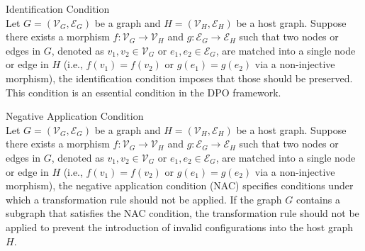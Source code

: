 \begin{definition}{Identification Condition \\}
	Let $G = (\mathcal{V}_G, \mathcal{E}_G)$ be a graph and $H = (\mathcal{V}_H, \mathcal{E}_H)$ be a host graph. Suppose there exists a morphism $f: \mathcal{V}_G \rightarrow \mathcal{V}_H$ and $g: \mathcal{E}_G \rightarrow \mathcal{E}_H$ such that two nodes or edges in $G$, denoted as $v_{1}, v_{2} \in \mathcal{V}_G$ or $e_{1}, e_{2} \in \mathcal{E}_G$, are matched into a single node or edge in $H$ (i.e., $f(v_{1}) = f(v_{2})$ or $g(e_{1}) = g(e_{2})$ via a non-injective morphism), the identification condition imposes that those should be preserved. This condition is an essential condition in the DPO framework.
\end{definition}

\begin{definition}{Negative Application Condition \\}
	Let $G = (\mathcal{V}_G, \mathcal{E}_G)$ be a graph and $H = (\mathcal{V}_H, \mathcal{E}_H)$ be a host graph. Suppose there exists a morphism $f: \mathcal{V}_G \rightarrow \mathcal{V}_H$ and $g: \mathcal{E}_G \rightarrow \mathcal{E}_H$ such that two nodes or edges in $G$, denoted as $v_{1}, v_{2} \in \mathcal{V}_G$ or $e_{1}, e_{2} \in \mathcal{E}_G$, are matched into a single node or edge in $H$ (i.e., $f(v_{1}) = f(v_{2})$ or $g(e_{1}) = g(e_{2})$ via a non-injective morphism), the negative application condition (NAC) specifies conditions under which a transformation rule should not be applied. If the graph $G$ contains a subgraph that satisfies the NAC condition, the transformation rule should not be applied to prevent the introduction of invalid configurations into the host graph $H$.
\end{definition}


